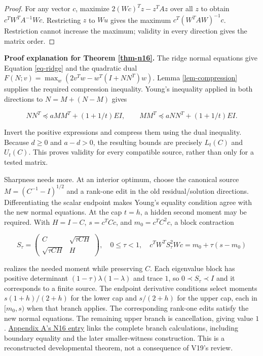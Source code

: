 \documentclass{article}
\theoremstyle{definition}
\begin{document}
\begin{proof}

For any vector \(c\), maximize \(2(Wc)^Tz-z^TAz\) over all \(z\) to
obtain \(c^TW^TA^{-1}Wc\). Restricting \(z\) to \(Wu\) gives the maximum
\(c^T(W^TAW)^{-1}c\). Restriction cannot increase the maximum; validity
in every direction gives the matrix order.
\end{proof}

\textbf{Proof explanation for Theorem \ref{thm-n16}.} The ridge normal
equations give Equation \ref{eq-ridge} and the quadratic dual
\(F(N;v)=\max_w(2v^Tw-w^T(I+NN^T)w)\). Lemma \ref{lem-compression}
supplies the required compression inequality. Young's inequality applied
in both directions to \(N=M+(N-M)\) gives

\begin{equation}
NN^T\preceq aMM^T+(1+1/t)EI,
 \qquad MM^T\preceq aNN^T+(1+1/t)EI.
 \label{eq-young}
\end{equation}

Invert the positive expressions and compress them using the dual
inequality. Because \(d\geq0\) and \(a-d>0\), the resulting bounds are
precisely \(L_t(C)\) and \(U_t(C)\). This proves validity for every
compatible source, rather than only for a tested matrix.

Sharpness needs more. At an interior optimum, choose the canonical
source \(M=(C^{-1}-I)^{1/2}\) and a rank-one edit in the old
residual/solution directions. Differentiating the scalar endpoint makes
Young's equality condition agree with the new normal equations. At the
cap \(t=h\), a hidden second moment may be required. With \(H=I-C\),
\(s=c^TCc\), and \(m_0=c^TC^2c\), a block contraction

\begin{equation}
S_\tau=\begin{pmatrix}C&\sqrt{\tau CH}\\\sqrt{\tau CH}&H\end{pmatrix},
 \quad 0\leq\tau<1,
 \quad c^TW^TS_\tau^2Wc=m_0+\tau(s-m_0)
 \label{eq-dilation}
\end{equation}

realizes the needed moment while preserving \(C\). Each eigenvalue block
has positive determinant \((1-\tau)\lambda(1-\lambda)\) and trace \(1\),
so \(0\prec S_\tau\prec I\) and it corresponds to a finite source. The
endpoint derivative conditions select moments \(s(1+h)/(2+h)\) for the
lower cap and \(s/(2+h)\) for the upper cap, each in \([m_0,s)\) when
that branch applies. The corresponding rank-one edits satisfy the new
normal equations. The remaining upper branch is cancellation, giving
value \(1\).
\href{https://github.com/TristanMiano/value_logic/blob/main/v3/report/claims.md\#n16}{Appendix
A's N16 entry} links the complete branch calculations, including
boundary equality and the later smaller-witness construction. This is a
reconstructed developmental theorem, not a consequence of V19's review.
\end{document}

